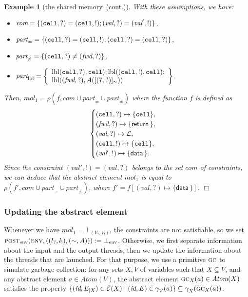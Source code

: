 \documentclass{article}
\newcommand{\bydef}{:=}
\newcommand{\boxexample}{$\Box$}
\newtheorem{example}[thm]{Example}
\newcommand{\Labels}{\mathcal{L}}
\newcommand{\rec}{?}
\newcommand{\eme}{!}
\newcommand{\internal}[1]{\textnormal{\texttt{#1}}}
\newcommand{\data}[1]{\textsf{#1}\,}
\newcommand{\variable}[1]{\textit{#1}}
\newcommand{\cdata}{\data{data}}
\newcommand{\addread}{\data{return}}
\newcommand{\port}{\variable{fwd}}
\newcommand{\ccell}{\internal{cell}}
\newcommand{\datawrite}{\variable{val}'}
\newcommand{\dataread}{\variable{val}}
\newcommand{\memlabg}{7}
\newcommand{\env}[1]{\mathcal{E}(#1)}
\newcommand{\lrec}{l_{\rec}}
\newcommand{\leme}{l_{\eme}}
\newcommand{\Vrec}{V_{\rec}}
\newcommand{\Veme}{V_{\eme}}
\newcommand{\continued}{(cont.)}
\newcommand{\abst}[1]{\textsc{post}_{#1}}
\newcommand{\envf}{\textsc{env}}
\newcommand{\Atomekey}{\textit{Atom}}
\newcommand{\Atomeshortkey}{}
\newcommand{\Atome}[1]{\Atomekey(#1)}
\newcommand{\Moleculeshortkey}{}
\newcommand{\gammaatome}[1]{\gamma^{\Atomeshortkey}_{#1}}
\newcommand{\botmolecule}[2]{\bot^{\Moleculeshortkey}_{\scriptscriptstyle ({\scriptscriptstyle #1},{\scriptscriptstyle #2})}}
\newcommand{\Envkey}{\mathrm{env}}
\newcommand{\botenv}{\bot_{\Envkey}}
\newcommand{\jgc}{\textsc{gc}}
\newcommand{\shareanalysis}{the shared memory}
\newcommand{\cflowanalysis}{\shareanalysis\ \continued}
\begin{document}
\begin{example}[\cflowanalysis]
With these assumptions, we have:
\begin{itemize}
\item $\textit{com}=\{(\ccell,\rec)=(\ccell,\eme);(\dataread,\rec)=(\datawrite,\eme)\}$, 
\item $\textit{part}_= = \{(\ccell,\rec)=(\ccell,\eme);(\ccell,\rec)=(\ccell,\rec)\}$, 
\item $\textit{part}_{\not =}=\{(\ccell,\rec)\not = (\port,\rec)\}$, 
\item $\textit{part}_{\text{lbl}}=\left\{\begin{array}{l}\textrm{lbl}(\ccell,\rec),\ccell);\textrm{lbl}((\ccell,\eme),\ccell);\cr
\textrm{lbl}((\port,\rec),A([(\memlabg,\rec)]_\sim))\end{array}\right\}$.
\end{itemize}
Then, $\textit{mol}_1 = \rho(f,\textit{com}\cup\textit{part}_=\cup \textit{part}_{\not =})$ 
where the function $f$ is defined as 
\begin{equation*}
\begin{cases}
(\ccell,\rec) \mapsto \{\ccell\},\cr 
(\port,\rec) \mapsto\{\addread\},\cr
(\dataread,\rec) \mapsto \Labels,\cr
(\ccell,\eme) \mapsto \{\ccell\},\cr
(\datawrite,\eme) \mapsto \{\cdata\}.
\end{cases}
\end{equation*}
Since the constraint $(\datawrite,\eme)=(\dataread,\rec)$ belongs to 
the set $\textit{com}$ of constraints, we can deduce that the abstract element $\textit{mol}_1$ is equal to $\rho(f',\textit{com}\cup\textit{part}_=\cup \textit{part}_{\not =})$, where $f'=f[(\dataread,\rec) \mapsto \{\cdata\}]$.
\boxexample\end{example}

\subsubsection{Updating the abstract element}

Whenever we have $\textit{mol}_1=\botmolecule{\Vrec}{\Veme}$, the constraints are not satisfiable, so we set $\abst{\Envkey}(\envf,((\lrec,\leme),(\sim,A))) \bydef\botenv$. Otherwise, we first separate information about the input and the output threads, then we update the information about the threads that are launched. For that purpose, we use a primitive  $\jgc$ to simulate garbage collection: for any sets $X,V$ of variables such that $X\subseteq V$, and any abstract element $a\in\Atome{V}$, the  abstract element $\jgc_X(a)\in\Atome{X}$ satisfies the property $\{(\textit{id},E_{|X})\in\env{X}\;|\;(\textit{id},E)\in\gammaatome{V}(a)\}\subseteq \gammaatome{X}(\jgc_X(a))$.
\end{document}
